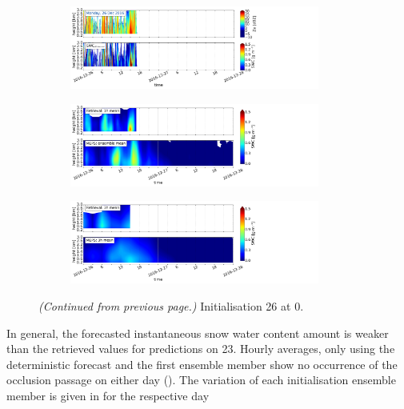 \begin{figure}[H]\ContinuedFloat
	\centering
	\begin{subfigure}[t]{\textwidth}
		\centering
		\includegraphics[trim={0.cm 2.2cm 19.cm 0.5cm},clip,width=0.9\textwidth]{./fig_obs_ret/20161226}
		\caption{}\label{fig:SWC:ret_26}
	\end{subfigure}
	\begin{subfigure}[t]{\textwidth}
		\centering
		\includegraphics[trim={0.cm 2.2cm 19.cm 0.5cm},clip,width=0.9\textwidth]{./fig_vert_SWC_EM/20161226}
		\caption{}\label{fig:SWC_EM:26}
	\end{subfigure}
	\begin{subfigure}[t]{\textwidth}
		\centering
		\includegraphics[trim={0.cm 0.8cm 19.cm 0.5cm},clip,width=0.9\textwidth]{./fig_vert_SWC_3h/20161226}
		\caption{}\label{fig:SWC3h:26}
	\end{subfigure}
	\caption{\textit{(Continued from previous page.)} Initialisation \SI{26}{\dec} at \SI{0}{\UTC}.}
\end{figure}
\noindent
In general, the forecasted instantaneous snow water content amount is weaker than the retrieved values for predictions on \SI{23}{\dec}. Hourly averages, only using the deterministic forecast and the first ensemble member show no occurrence of the occlusion passage on either day (). The variation of each initialisation ensemble member is given in  for the respective day
